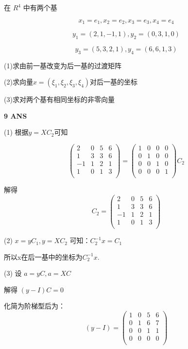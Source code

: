 \documentclass[11pt,letterpaper]{ctexart}
\begin{document}
\begin{enumerate}
在 $R^4$ 中有两个基

 \[x_1 = e_1, x_2 = e_2, x_3 = e_3, x_4 = e_4\]

 \[y_1 = (2,1,-1,1), y_2 = (0, 3, 1, 0)\]

 \[y_3 = (5, 3, 2, 1), y_4 = (6, 6, 1, 3) \]

(1)求由前一基改变为后一基的过渡矩阵

(2)求向量$x = (\xi_1, \xi_2, \xi_3, \xi_4)$对后一基的坐标

(3)求对两个基有相同坐标的非零向量

\textbf{9 ANS}
\bigskip

	(1) 根据$y=XC_2$可知

		\[\begin{pmatrix}
			2 & 0 & 5 & 6 \\
			1 & 3 & 3 & 6 \\
			-1 & 1 & 2 & 1 \\
			1 & 0 & 1 & 3 \\
		\end{pmatrix}= 
		\begin{pmatrix}
			1 & 0 & 0 & 0 \\
			0 & 1 & 0 & 0 \\
			0 & 0 & 1 & 0 \\
			0 & 0 & 0 & 1 \\
		\end{pmatrix}C_2\]


		解得\[C_2 = \begin{pmatrix}
			2 & 0 & 5 & 6 \\
			1 & 3 & 3 & 6 \\
			-1 & 1 & 2 & 1 \\
			1 & 0 & 1 & 3 \\
		\end{pmatrix}\]


	(2) $x = yC_1, y = XC_2$ 可知：$C_2^{-1}x = C_1$

	所以x在后一基中的坐标为$C_2^{-1}x$.


	(3) 设 $a = yC, a = XC$
	
	

	解得 $(y - I)C = 0$ 
	
	化简为阶梯型后为：
	\[(y - I) = \begin{pmatrix}
		1 & 0 & 5 & 6 \\
		0 & 1 & 6 & 7 \\
		0 & 0 & 1 & 1 \\
		0 & 0 & 0 & 0 \\
	\end{pmatrix}\]


\end{enumerate}
\end{document}
